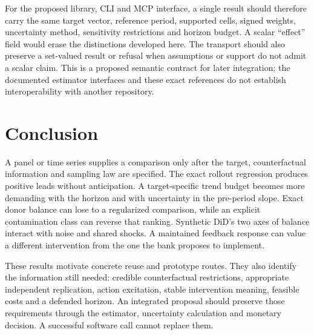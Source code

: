 For the proposed library, CLI and MCP interface, a single result should
therefore carry the same target vector, reference period, supported
cells, signed weights, uncertainty method, sensitivity restrictions
and horizon budget. A scalar ``effect'' field would erase the
distinctions developed here. The transport should also preserve a
set-valued result or refusal when assumptions or support do not
admit a scalar claim. This is a proposed semantic contract for later
integration; the documented estimator interfaces and these exact
references do not establish interoperability with another repository.

\section{Conclusion}
\label{exec17:s6-end}

A panel or time series supplies a comparison only after the target,
counterfactual information and sampling law are specified. The exact
rollout regression produces positive leads without anticipation.
A target-specific trend budget becomes more demanding with the
horizon and with uncertainty in the pre-period slope. Exact donor
balance can lose to a regularized comparison, while an explicit
contamination class can reverse that ranking. Synthetic DiD's two
axes of balance interact with noise and shared shocks. A maintained
feedback response can value a different intervention from the one
the bank proposes to implement.

These results motivate concrete reuse and prototype routes. They
also identify the information still needed: credible counterfactual
restrictions, appropriate independent replication, action excitation,
stable intervention meaning, feasible costs and a defended horizon.
An integrated proposal should preserve those requirements through
the estimator, uncertainty calculation and monetary decision. A
successful software call cannot replace them.
